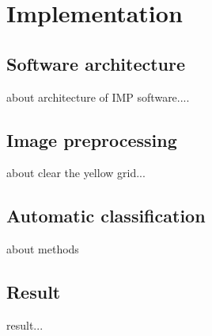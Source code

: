 \chapter{Implementation}
\section{Software architecture}
about architecture of IMP software....
\section{Image preprocessing}
about clear the yellow grid...
\section{Automatic classification }
about methods
\section{Result}
result...
